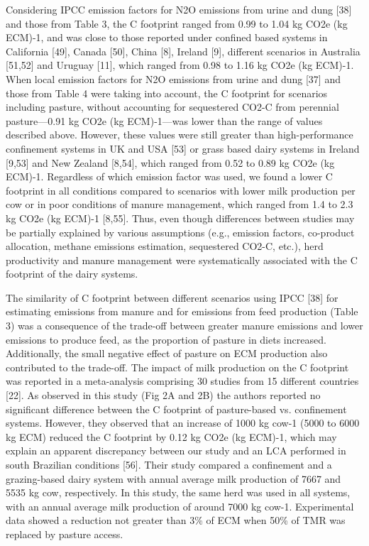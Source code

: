 \documentclass[11pt,a4paper]{article}
\begin{document}
Considering IPCC emission factors for N2O emissions from urine and dung [38] and those from Table 3, the C footprint ranged from 0.99 to 1.04 kg CO2e (kg ECM)-1, and was close to those reported under confined based systems in California [49], Canada [50], China [8], Ireland [9], different scenarios in Australia [51,52] and Uruguay [11], which ranged from 0.98 to 1.16 kg CO2e (kg ECM)-1. When local emission factors for N2O emissions from urine and dung [37] and those from Table 4 were taking into account, the C footprint for scenarios including pasture, without accounting for sequestered CO2-C from perennial pasture—0.91 kg CO2e (kg ECM)-1—was lower than the range of values described above. However, these values were still greater than high-performance confinement systems in UK and USA [53] or grass based dairy systems in Ireland [9,53] and New Zealand [8,54], which ranged from 0.52 to 0.89 kg CO2e (kg ECM)-1. Regardless of which emission factor was used, we found a lower C footprint in all conditions compared to scenarios with lower milk production per cow or in poor conditions of manure management, which ranged from 1.4 to 2.3 kg CO2e (kg ECM)-1 [8,55]. Thus, even though differences between studies may be partially explained by various assumptions (e.g., emission factors, co-product allocation, methane emissions estimation, sequestered CO2-C, etc.), herd productivity and manure management were systematically associated with the C footprint of the dairy systems.

The similarity of C footprint between different scenarios using IPCC [38] for estimating emissions from manure and for emissions from feed production (Table 3) was a consequence of the trade-off between greater manure emissions and lower emissions to produce feed, as the proportion of pasture in diets increased. Additionally, the small negative effect of pasture on ECM production also contributed to the trade-off. The impact of milk production on the C footprint was reported in a meta-analysis comprising 30 studies from 15 different countries [22]. As observed in this study (Fig 2A and 2B) the authors reported no significant difference between the C footprint of pasture-based vs. confinement systems. However, they observed that an increase of 1000 kg cow-1 (5000 to 6000 kg ECM) reduced the C footprint by 0.12 kg CO2e (kg ECM)-1, which may explain an apparent discrepancy between our study and an LCA performed in south Brazilian conditions [56]. Their study compared a confinement and a grazing-based dairy system with annual average milk production of 7667 and 5535 kg cow, respectively. In this study, the same herd was used in all systems, with an annual average milk production of around 7000 kg cow-1. Experimental data showed a reduction not greater than 3\% of ECM when 50\% of TMR was replaced by pasture access.
\end{document}

